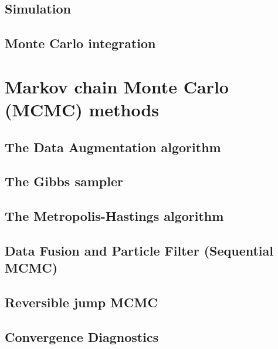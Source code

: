 \documentclass{report}
\begin{document}
\section{Simulation}
\section{Monte Carlo integration}

\chapter{Markov chain Monte Carlo (MCMC) methods}
\section{The Data Augmentation algorithm}
\section{The Gibbs sampler}
\section{The Metropolis-Hastings algorithm}
\section{Data Fusion and Particle Filter (Sequential MCMC)}
\section{Reversible jump MCMC}
\section{Convergence Diagnostics}
\end{document}
